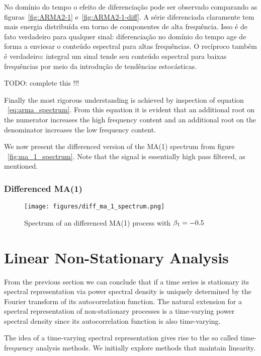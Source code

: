 No domínio do tempo o efeito de diferenciação pode ser observado comparando as
figuras~\ref{fig:ARMA2-1} e~\ref{fig:ARMA2-1-diff}. A série diferenciada
claramente tem mais energia distribuída em torno de componentes de alta
frequência. Isso é de fato verdadeiro para qualquer sinal: diferenciação
no domínio do tempo age de forma a enviesar o conteúdo espectral para altas
frequências. O recíproco também é verdadeiro: integral um sinal tende seu
conteúdo espectral para baixas frequências por meio da introdução de tendências
estocásticas.

TODO: complete this !!!

Finally the most rigorous understanding is achieved by inspection of equation
~\ref{eq:arma_spectrum}. From this equation it is evident that an additional
root on the numerator increases the high frequency content and an additional
root on the denominator increases the low frequency content.

We now present the differenced version of the MA(1) spectrum from figure
~\ref{fig:ma_1_spectrum}. Note that the signal is essentially high pass
filtered, as mentioned.

\subsubsection{Differenced MA(1)}

\begin{figure}[H]
    \centering
    \texttt{[image: figures/diff\_ma\_1\_spectrum.png]}
    \caption{Spectrum of an differenced MA(1) process with
    $\protect \beta_1 = -0.5$}
    \label{fig:diff_ma_1_spectrum}
\end{figure}


\section{Linear Non-Stationary Analysis}

From the previous section we can conclude that if a time series is stationary
its spectral representation via power spectral density is uniquely determined
by the Fourier transform of its autocorrelation function. The natural extension
for a spectral representation of non-stationary processes is a time-varying
power spectral density since its autocorrelation function is also time-varying.

The idea of a time-varying spectral representation gives rise to the so called
time-frequency analysis methods. We initially explore methods that maintain
linearity.

